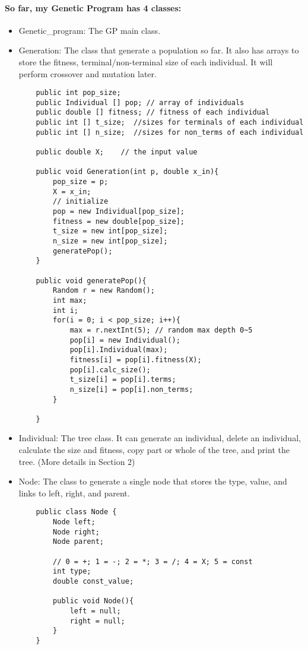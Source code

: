 \documentclass[12pt]{article}
\begin{document}
\paragraph{So far, my Genetic Program has 4 classes: }
\begin{itemize}
	\item Genetic\_program: The GP main class.
	\item Generation: The class that generate a population so far. It also has arrays to store the fitness, terminal/non-terminal size of each individual. It will perform crossover and mutation later.
	\begin{lstlisting}
    public int pop_size;
    public Individual [] pop; // array of individuals
    public double [] fitness; // fitness of each individual
    public int [] t_size;  //sizes for terminals of each individual
    public int [] n_size;  //sizes for non_terms of each individual
    
    public double X;	// the input value
    
    public void Generation(int p, double x_in){
        pop_size = p;
        X = x_in;
        // initialize
        pop = new Individual[pop_size];
        fitness = new double[pop_size];
        t_size = new int[pop_size];
        n_size = new int[pop_size];
        generatePop();
    }
    
    public void generatePop(){
        Random r = new Random();
        int max;
        int i;
        for(i = 0; i < pop_size; i++){
            max = r.nextInt(5); // random max depth 0~5
            pop[i] = new Individual();
            pop[i].Individual(max);
            fitness[i] = pop[i].fitness(X);
            pop[i].calc_size();
            t_size[i] = pop[i].terms;
            n_size[i] = pop[i].non_terms;
        }
        
    }
	\end{lstlisting}
	\item Individual: The tree class. It can generate an individual, delete an individual, calculate the size and fitness, copy part or whole of the tree, and print the tree. (More details in Section 2)
	\item Node: The class to generate a single node that stores the type, value, and links to left, right, and parent.
	\begin{lstlisting}
    public class Node {
        Node left;
        Node right;
        Node parent;
        
        // 0 = +; 1 = -; 2 = *; 3 = /; 4 = X; 5 = const
        int type;   
        double const_value;
        
        public void Node(){
            left = null;
            right = null;
        }
    }
	\end{lstlisting}
\end{itemize}
\end{document}
